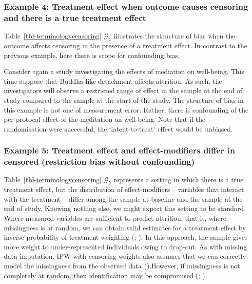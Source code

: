 \documentclass[
  single column]{article}
\begin{document}
\subsubsection{Example 4: Treatment effect when outcome causes censoring
and there is a true treatment
effect}\label{example-4-treatment-effect-when-outcome-causes-censoring-and-there-is-a-true-treatment-effect}

Table~\ref{tbl-terminologycensoring} \(\mathcal{G}_4\) illustrates the
structure of bias when the outcome affects censoring in the presence of
a treatment effect. In contrast to the previous example, here there is
scope for confounding bias.

Consider again a study investigating the effects of mediation on
well-being. This time suppose that Buddha-like detachment affects
attrition. As such, the investigators will observe a restricted range of
effect in the sample at the end of study compared to the sample at the
start of the study. The structure of bias in this example is not one of
measurement error. Rather, there is confounding of the per-protocal
effect of the meditation on well-being. Note that if the randomisation
were successful, the `intent-to-treat' effect would be unbiased.

\subsubsection{Example 5: Treatment effect and effect-modifiers differ
in censored (restriction bias without
confounding)}\label{example-5-treatment-effect-and-effect-modifiers-differ-in-censored-restriction-bias-without-confounding}

Table~\ref{tbl-terminologycensoring} \(\mathcal{G}_5\) represents a
setting in which there is a true treatment effect, but the distribution
of effect-modifiers -- variables that interact with the treatment --
differ among the sample at baseline and the sample at the end of study.
Knowing nothing else, we might expect this setting to be standard. Where
measured variables are sufficient to predict attrition, that is, where
missingness is at random, we can obtain valid estimates for a treatment
effect by inverse probability of treatment weighting
(;
). In this approach,
the sample gives more weight to under-represented individuals owing to
drop-out. As with missing data imputation, IPW with censoring weights
also assumes that we can correctly model the missingness from the
observed data ().However, if missingness is not completely at random, then
identification may be compromised
(;
).
\end{document}
